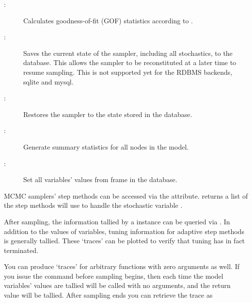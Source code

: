 \begin{description}
    \item[:] Calculates goodness-of-fit (GOF) statistics according to \cite{Brooks:2000il}.
    \item[:] Saves the current state of the sampler, including all stochastics, to the database. This allows the sampler to be reconstituted at a later time to resume sampling. This is not supported yet for the RDBMS backends, sqlite and mysql.
    \item[:] Restores the sampler to the state stored in the database.
	 \item[:] Generate summary statistics for all nodes in the model.
    \item[:] Set all variables' values from frame  in the database.
\end{description}

MCMC samplers' step methods can be accessed via the  attribute.  returns a list of the step methods  will use to handle the stochastic variable .

After sampling, the information tallied by a  instance   can be queried via . In addition to the values of variables, tuning information for adaptive step methods is generally tallied. These `traces' can be plotted to verify that tuning has in fact terminated.

You can produce `traces' for arbitrary functions with zero arguments as well. If you issue the command  before sampling begins, then each time the model variables' values are tallied  will be called with no arguments, and the return value will be tallied. After sampling ends you can retrieve the trace as 

\hypertarget{sampler}{}

